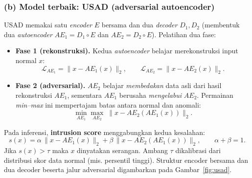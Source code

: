 \documentclass[11pt,a4paper]{article}
\begin{document}
\subsubsection*{(b) Model terbaik: USAD (adversarial autoencoder)}
USAD memakai satu \emph{encoder} $E$ bersama dan dua \emph{decoder} $D_1, D_2$
(membentuk dua \emph{autoencoder} $AE_1 = D_1\!\circ\!E$ dan
$AE_2 = D_2\!\circ\!E$). Pelatihan dua fase:
\begin{itemize}[leftmargin=1.4em]
  \item \textbf{Fase 1 (rekonstruksi).} Kedua \emph{autoencoder} belajar
  merekonstruksi input normal $x$:
  \begin{equation}
  \mathcal{L}_{AE_1} = \lVert x - AE_1(x) \rVert_2, \qquad
  \mathcal{L}_{AE_2} = \lVert x - AE_2(x) \rVert_2 .
  \end{equation}
  \item \textbf{Fase 2 (adversarial).} $AE_2$ belajar \emph{membedakan} data
  asli dari hasil rekonstruksi $AE_1$, sementara $AE_1$ berusaha
  \emph{mengelabui} $AE_2$. Permainan \emph{min--max} ini mempertajam batas
  antara normal dan anomali:
  \begin{equation}
  \min_{AE_1}\max_{AE_2}\;
  \lVert x - AE_2(AE_1(x)) \rVert_2 .
  \end{equation}
\end{itemize}
Pada inferensi, \textbf{intrusion score} menggabungkan kedua kesalahan:
\begin{equation}
s(x) = \alpha\,\lVert x - AE_1(x)\rVert_2
     + \beta\,\lVert x - AE_2(AE_1(x))\rVert_2,
\qquad \alpha+\beta = 1 .
\end{equation}
Jika $s(x) > \tau$ maka $x$ dinyatakan serangan. Ambang $\tau$ dikalibrasi dari
distribusi skor data normal (mis. persentil tinggi). Struktur encoder bersama dan
dua decoder beserta jalur adversarial digambarkan pada Gambar~\ref{fig:usad}.
\end{document}
